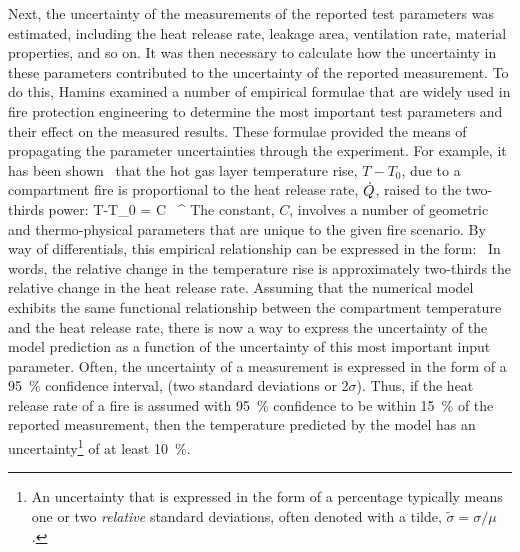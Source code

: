 Next, the
uncertainty of the measurements of the reported test parameters was estimated, including the heat release rate,
leakage area, ventilation rate, material
properties, and so on. It was then necessary to calculate how the uncertainty in these parameters contributed to
the uncertainty of the reported measurement. To do this, Hamins
examined a number of empirical formulae that are widely used in fire protection engineering to determine the
most important test parameters and their effect on the measured results. These formulae provided the means of propagating
the parameter uncertainties through the experiment.
For example, it has been shown~\cite{SFPE:Walton} that the hot gas layer temperature rise, $T-T_0$, due to
a compartment fire is proportional to the heat release rate, $\dot{Q}$, raised to the two-thirds power:
\be T-T_0 = C \, \dQ^{} \ee
The constant, $C$, involves a number of geometric and thermo-physical parameters that are unique to the given
fire scenario. By way of differentials, this empirical relationship can be expressed in the form:
\be {} \approx {} \, \frac{\Delta \dQ}{\dQ}  \ee
In words, the relative change in the temperature rise is approximately two-thirds the relative change
in the heat release rate. Assuming that the numerical model exhibits the same functional relationship between the compartment
temperature and the heat release rate, there is now a way to express the uncertainty of the model prediction as a function
of the uncertainty of this most
important input parameter. Often, the uncertainty of a measurement is expressed in the form of a 95~\% confidence interval,
(two standard deviations or 2$\sigma$).
Thus, if the heat release rate of a fire is assumed with 95~\% confidence to be
within 15~\% of the reported measurement, then the temperature
predicted by the model has an uncertainty\footnote{An uncertainty that is expressed in the form of a
percentage typically means one or two {\em relative} standard deviations, often denoted with a tilde,
$\widetilde{\sigma}=\sigma/\mu$.} of at least 10~\%.



